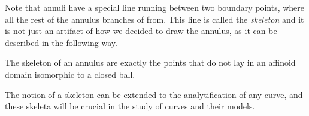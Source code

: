 Note that annuli have a special line running between two boundary points, where all the rest of the annulus branches of from. This line is called the \emph{skeleton} and it is not just an artifact of how we decided to draw the annulus, as it can be described in the following way. 
\begin{proposition}
	The skeleton of an annulus are exactly the points that do not lay in an affinoid domain isomorphic to a closed ball.  
\end{proposition}

The notion of a skeleton can be extended to the analytification of any curve, and these skeleta will be crucial in the study of curves and their models. 

